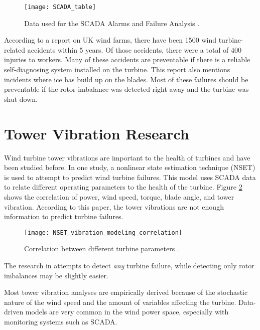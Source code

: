 \begin{figure}
	\centering
	\texttt{[image: SCADA\_table]}
	\decoRule
	\caption{Data used for the SCADA Alarms and Failure Analysis \cite{wind_turbine_failures}. 
}
	\label{fig:SCADA_table}
\end{figure}

According to a report on UK wind farms\cite{UK_turbine_failures}, there have been 1500 wind turbine-related accidents within 5 years.  Of those accidents, there were a total of 400 injuries to workers.  Many of these accidents are preventable if there is a reliable self-diagnosing system installed on the turbine.  This report also mentions incidents where ice has build up on the blades.  Most of these failures should be preventable if the rotor imbalance was detected right away and the turbine was shut down.


\section{Tower Vibration Research}
Wind turbine tower vibrations are important to the health of turbines and have been studied before.  In one study, a nonlinear state estimation technique\cite{NSET_vibration_modeling} (NSET) is used to attempt to predict wind turbine failures.  This model uses SCADA data to relate different operating parameters to the health of the turbine.  Figure \ref{fig:NSET_vibration_modeling_correlation} shows the correlation of power, wind speed, torque, blade angle, and tower vibration.  According to this paper, the tower vibrations are not enough information to predict turbine failures.

\begin{figure}
	\centering
	\texttt{[image: NSET\_vibration\_modeling\_correlation]}
	\decoRule
	\caption{Correlation between different turbine parameters \cite{NSET_vibration_modeling}. }
	\label{fig:NSET_vibration_modeling_correlation}
\end{figure}

The research in \cite{NSET_vibration_modeling} attempts to detect \textit{any} turbine failure, while detecting only rotor imbalances may be slightly easier.

Most tower vibration analyses are empirically derived because of the stochastic nature of the wind speed and the amount of variables affecting the turbine.  Data-driven models\cite{data_driven_online_monitoring} are very common in the wind power space, especially with monitoring systems such as SCADA.

